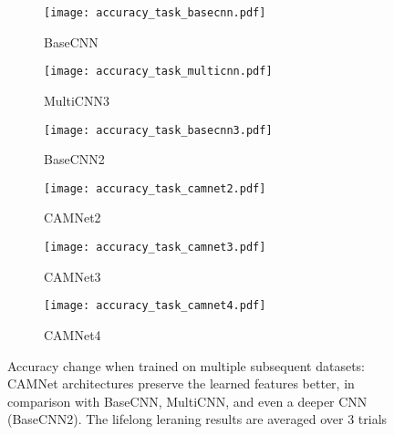 \documentclass[10pt,twocolumn,letterpaper]{article}
\begin{document}
\begin{figure}[t]
	\begin{center}
		\begin{subfigure}[b]{0.32\linewidth}
			\texttt{[image: accuracy\_task\_basecnn.pdf]} 
			\caption{BaseCNN}
		\end{subfigure}
		\begin{subfigure}[b]{0.32\linewidth}
			\texttt{[image: accuracy\_task\_multicnn.pdf]}
			\caption{MultiCNN3}
		\end{subfigure}
		\begin{subfigure}[b]{0.32\linewidth}
			\texttt{[image: accuracy\_task\_basecnn3.pdf]}
			\caption{BaseCNN2}
		\end{subfigure}
		\begin{subfigure}[b]{0.32\linewidth}
			\texttt{[image: accuracy\_task\_camnet2.pdf]}
			\caption{CAMNet2}
		\end{subfigure}
		\begin{subfigure}[b]{0.32\linewidth}
			\texttt{[image: accuracy\_task\_camnet3.pdf]} 
			\caption{CAMNet3}
		\end{subfigure}
		\begin{subfigure}[b]{0.32\linewidth}
			\texttt{[image: accuracy\_task\_camnet4.pdf]}
			\caption{CAMNet4}
		\end{subfigure}
	\end{center}
	\vspace{-0.2in}
	\caption{Accuracy change when trained on multiple subsequent datasets: CAMNet architectures preserve the learned features better, in comparison with BaseCNN, MultiCNN, and even a deeper CNN (BaseCNN2). The lifelong leraning results are averaged over 3 trials}
	\label{fig:lwf_plots}
	\vspace{-0.1in}
\end{figure}
\end{document}
